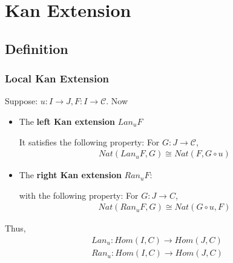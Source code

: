 \documentclass[Total.tex]{subfiles}
\begin{document}
	\chapter{Kan Extension}
		\section{Definition}
			\subsection{Local Kan Extension}
			\begin{Def} Suppose: $u:I\rightarrow J,F:I\rightarrow \mathcal{C}$. Now
				\begin{itemize}
					\item The \textbf{left Kan extension} $Lan_uF$
					\begin{center}
					\end{center} 
					
					It satisfies the following property: For $G:J\rightarrow \mathcal{C}$,
					\begin{gather*}
						Nat(Lan_u F,G)\cong Nat(F,G\circ u)
					\end{gather*}
					\item The \textbf{right Kan extension} $Ran_u F$:
					\begin{center}
					\end{center}
					
					with the following property: For $G:J\rightarrow C$,
					\begin{gather*}
						Nat(Ran_u F,G)\cong Nat(G\circ u, F)
					\end{gather*}
				\end{itemize}
			\end{Def}
			
			Thus, 
			\begin{gather*}
				Lan_u:Hom(I,C)\rightarrow Hom(J,C)\\
				Ran_u:Hom(I,C)\rightarrow Hom(J,C)
			\end{gather*}
			
\end{document}

